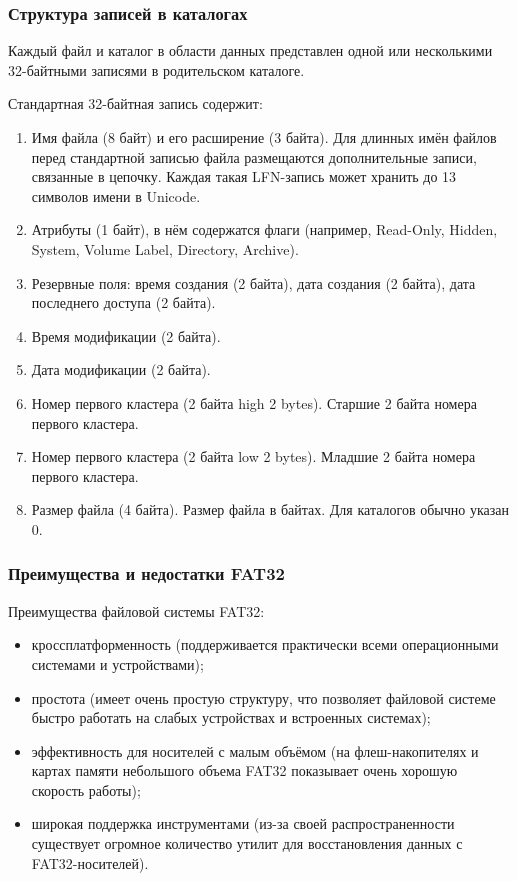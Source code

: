 \subsubsection{Структура записей в каталогах}

Каждый файл и каталог в области данных представлен одной или несколькими 32-байтными записями в родительском каталоге.

Стандартная 32-байтная запись содержит:

\begin{enumerate}
\item Имя файла (8 байт) и его расширение (3 байта). Для длинных имён файлов перед стандартной записью файла размещаются дополнительные записи, связанные в цепочку. Каждая такая LFN-запись может хранить до 13 символов имени в Unicode.
\item Атрибуты (1 байт), в нём содержатся флаги (например, Read-Only, Hidden, System, Volume Label, Directory, Archive).
\item Резервные поля: время создания (2 байта), дата создания (2 байта), дата последнего доступа (2 байта).
\item Время модификации (2 байта).
\item Дата модификации (2 байта).
\item Номер первого кластера (2 байта high 2 bytes). Старшие 2 байта номера первого кластера.
\item Номер первого кластера (2 байта low 2 bytes). Младшие 2 байта номера первого кластера.
\item Размер файла (4 байта). Размер файла в байтах. Для каталогов обычно указан 0.
\end{enumerate}

\subsubsection{Преимущества и недостатки FAT32}

Преимущества файловой системы FAT32:

\begin{itemize}
\item кроссплатформенность (поддерживается практически всеми операционными системами и устройствами);
\item простота (имеет очень простую структуру, что позволяет файловой системе быстро работать на слабых устройствах и встроенных системах);
\item эффективность для носителей с малым объёмом (на флеш-накопителях и картах памяти небольшого объема FAT32 показывает очень хорошую скорость работы);
\item широкая поддержка инструментами (из-за своей распространенности существует огромное количество утилит для восстановления данных с FAT32-носителей).
\end{itemize}


